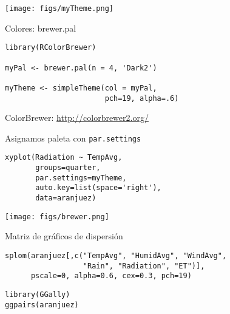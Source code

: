 \documentclass[aspectratio=169, usenames,svgnames,dvipsnames]{beamer}
\begin{document}
\begin{frame}[label={sec:org10fe9be}]{}
\begin{center}
\texttt{[image: figs/myTheme.png]}
\end{center}
\end{frame}

\begin{frame}[label={sec:org267f8c8},fragile]{Colores: brewer.pal}
 \lstset{language=r,label= ,caption= ,captionpos=b,numbers=none}
\begin{lstlisting}
library(RColorBrewer)

myPal <- brewer.pal(n = 4, 'Dark2')

myTheme <- simpleTheme(col = myPal,
                       pch=19, alpha=.6)
\end{lstlisting}

\begin{block}{ColorBrewer: \url{http://colorbrewer2.org/}}
\end{block}
\end{frame}

\begin{frame}[label={sec:orgc040022},fragile]{Asignamos paleta con \texttt{par.settings}}
 \lstset{language=r,label= ,caption= ,captionpos=b,numbers=none}
\begin{lstlisting}
xyplot(Radiation ~ TempAvg,
       groups=quarter,
       par.settings=myTheme,
       auto.key=list(space='right'),
       data=aranjuez)
\end{lstlisting}
\end{frame}

\begin{frame}[label={sec:orgac89a31}]{}
\begin{center}
\texttt{[image: figs/brewer.png]}
\end{center}
\end{frame}

\begin{frame}[label={sec:org2fad885},fragile]{Matriz de gráficos de dispersión}
 \lstset{language=r,label= ,caption= ,captionpos=b,numbers=none}
\begin{lstlisting}
splom(aranjuez[,c("TempAvg", "HumidAvg", "WindAvg",
                  "Rain", "Radiation", "ET")],
      pscale=0, alpha=0.6, cex=0.3, pch=19)
\end{lstlisting}

\lstset{language=r,label= ,caption= ,captionpos=b,numbers=none}
\begin{lstlisting}
library(GGally)
ggpairs(aranjuez)
\end{lstlisting}
\end{frame}
\end{document}
